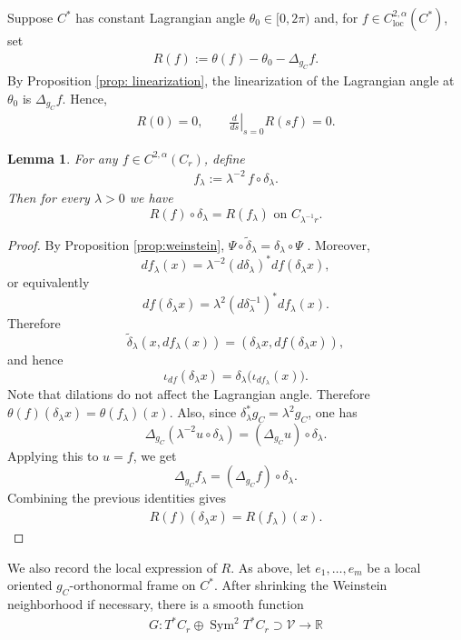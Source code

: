 \documentclass[11pt]{amsart}
\newtheorem{lemma}{Lemma}
\theoremstyle{definition}
\theoremstyle{remark}
\newcommand{\R}{\mathbb{R}}
\begin{document}
Suppose $C^\ast$ has constant Lagrangian angle $\theta_0\in [0,2\pi)$ and, for $f\in C^{2,\alpha}_{\text{loc}}(C^\ast)$, set
\begin{align}\label{eq: def-rest-term-angle}
    R(f):=\theta(f)-\theta_0-\Delta_{g_C} f.
\end{align}
By Proposition \ref{prop: linearization}, the linearization of the
Lagrangian angle at $\theta_0$ is \(\Delta_{g_C}f\). Hence,
\begin{align}\label{eq: properties-of-R}
    R(0)=0,
    \qquad
    \left.\frac{d}{ds}\right|_{s=0}R(sf)=0 .
\end{align}
\begin{lemma}\label{lem:R-rescaling}
For any
$f\in C^{2,\alpha}(C_{r})$, define
\begin{align}
\label{eq: def-f-lambda}
f_\lambda := \lambda^{-2}\,f\circ \delta_\lambda.
\end{align}
Then for every \(\lambda>0\) we have
\[
    R(f)\circ\delta_\lambda=R(f_\lambda) \text{ on } C_{\lambda^{-1}r}.
\]
\end{lemma}
\begin{proof}
By Proposition \ref{prop:weinstein}, $   \Psi\circ\widetilde \delta_\lambda=\delta_\lambda \circ\Psi$ .
Moreover,
\[
    df_\lambda(x)
    =
    \lambda^{-2}(d\delta_\lambda)^*df(\delta_\lambda x),
\]
or equivalently
\[
    df(\delta_\lambda x)
    =
    \lambda^2(d\delta_\lambda^{-1})^*df_\lambda(x).
\]
Therefore
\[
    \widetilde\delta_\lambda(x,df_\lambda(x))
    =
    (\delta_\lambda x,df(\delta_\lambda x)),
\]
and hence
\[
    \iota_{df}(\delta_\lambda x)
    =
    \delta_\lambda\big(\iota_{df_\lambda}(x)\big).
\]
Note that dilations do not affect the Lagrangian angle. Therefore $\theta(f)(\delta_\lambda x)=\theta(f_\lambda)(x)$.
Also, since \(\delta_\lambda^*g_C=\lambda^2g_C\), one has
\[
    \Delta_{g_C}(\lambda^{-2}u\circ\delta_\lambda)
    =
    (\Delta_{g_C}u)\circ\delta_\lambda .
\]
Applying this to \(u=f\), we get
\[
    \Delta_{g_C}f_\lambda
    =
    (\Delta_{g_C}f)\circ\delta_\lambda .
\]
Combining the previous identities gives
\begin{align*}
     R(f)(\delta_\lambda x)
    =
    R(f_\lambda)(x).
\end{align*}
\end{proof}
We also record the local expression of \(R\). As above, let \(e_1,\ldots,e_m\) be a local oriented \(g_C\)-orthonormal frame on \(C^\ast\).
After shrinking the Weinstein neighborhood if necessary, there
is a smooth function
\begin{align}\label{eq: def-of-H}
    G:
    T^*C_r\oplus \operatorname{Sym}^2T^*C_r
    \supset \mathcal V
    \longrightarrow \R
\end{align}
\end{document}
